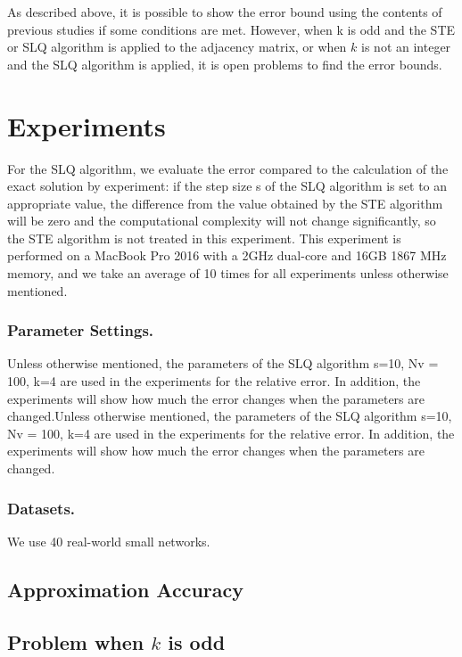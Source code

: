 \documentclass[senior,final,11pt]{iscs-thesis}
\begin{document}
As described above, it is possible to show the error bound using the contents of previous studies if some conditions are met. However, when k is odd and the STE or SLQ algorithm is applied to the adjacency matrix, or when $k$ is not an integer and the SLQ algorithm is applied, it is open problems to find the error bounds.

\section{Experiments}
For the SLQ algorithm, we evaluate the error compared to the calculation of the exact solution by experiment: if the step size s of the SLQ algorithm is set to an appropriate value, the difference from the value obtained by the STE algorithm will be zero and the computational complexity will not change significantly, so the STE algorithm is not treated in this experiment. This experiment is performed on a MacBook Pro 2016 with a 2GHz dual-core and 16GB 1867 MHz memory, and we take an average of 10 times for all experiments unless otherwise mentioned.

\subsubsection*{Parameter Settings.}
Unless otherwise mentioned, the parameters of the SLQ algorithm s=10, Nv = 100, k=4 are used in the experiments for the relative error. In addition, the experiments will show how much the error changes when the parameters are changed.Unless otherwise mentioned, the parameters of the SLQ algorithm s=10, Nv = 100, k=4 are used in the experiments for the relative error. In addition, the experiments will show how much the error changes when the parameters are changed.

\subsubsection*{Datasets.} We use 40 real-world small networks\cite{nr}.


\subsection{Approximation Accuracy}

\subsection{Problem when $k$ is odd}
\end{document}
